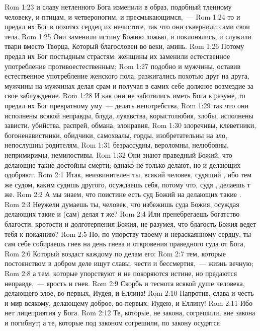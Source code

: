 \vs Rom 1:23 и славу нетленного Бога изменили в образ, подобный тленному человеку, и птицам, и четвероногим, и пресмыкающимся,~---
\vs Rom 1:24 то и предал их Бог в похотях сердец их нечистоте, так что они сквернили сами свои тела.
\vs Rom 1:25 Они заменили истину Божию ложью, и поклонялись, и служили твари вместо Творца, Который благословен во веки, аминь.
\vs Rom 1:26 Потому предал их Бог постыдным страстям: женщины их заменили естественное употребление противоестественным;
\vs Rom 1:27 подобно и мужчины, оставив естественное употребление женского пола, разжигались похотью друг на друга, мужчины на мужчинах делая срам и получая в самих себе должное возмездие за свое заблуждение.
\vs Rom 1:28 И как они не заботились иметь Бога в разуме, то предал их Бог превратному уму~--- делать непотребства,
\vs Rom 1:29 так что они исполнены всякой неправды, блуда, лукавства, корыстолюбия, злобы, исполнены зависти, убийства, распрей, обмана, злонравия,
\vs Rom 1:30 злоречивы, клеветники, богоненавистники, обидчики, самохвалы, горды, изобретательны на зло, непослушны родителям,
\vs Rom 1:31 безрассудны, вероломны, нелюбовны, непримиримы, немилостивы.
\vs Rom 1:32 Они знают праведный  Божий, что делающие такие  достойны смерти; однако не только  делают, но и делающих одобряют.
\vs Rom 2:1 Итак, неизвинителен ты, всякий человек, судящий , ибо тем же судом, каким судишь другого, осуждаешь себя, потому что, судя , делаешь т же.
\vs Rom 2:2 А мы знаем, что поистине есть суд Божий на делающих такие .
\vs Rom 2:3 Неужели думаешь ты, человек, что избежишь суда Божия, осуждая делающих такие  и (сам) делая т же?
\vs Rom 2:4 Или пренебрегаешь богатство благости, кротости и долготерпения Божия, не разумея, что благость Божия ведет тебя к покаянию?
\vs Rom 2:5 Но, по упорству твоему и нераскаянному сердцу, ты сам себе собираешь гнев на день гнева и откровения праведного суда от Бога,
\vs Rom 2:6 Который воздаст каждому по делам его:
\vs Rom 2:7 тем, которые постоянством в добром деле ищут славы, чести и бессмертия,~--- жизнь вечную;
\vs Rom 2:8 а тем, которые упорствуют и не покоряются истине, но предаются неправде,~--- ярость и гнев.
\vs Rom 2:9 Скорбь и теснота всякой душе человека, делающего злое, во-первых, Иудея,  и Еллина!
\vs Rom 2:10 Напротив, слава и честь и мир всякому, делающему доброе, во-первых, Иудею,  и Еллину!
\vs Rom 2:11 Ибо нет лицеприятия у Бога.
\rsbpar\vs Rom 2:12 Те, которые, не  закона, согрешили, вне закона и погибнут; а те, которые под законом согрешили, по закону осудятся
